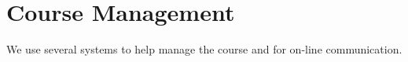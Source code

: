 \section{Course Management}

We use several systems to help manage the course
and for on-line communication.





